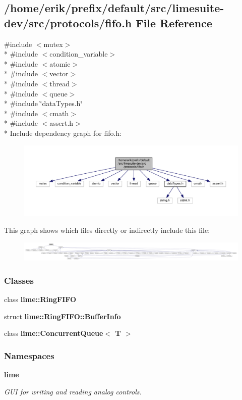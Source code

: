 \subsection{/home/erik/prefix/default/src/limesuite-\/dev/src/protocols/fifo.h File Reference}
\label{fifo_8h}
{\ttfamily \#include $<$mutex$>$}\\*
{\ttfamily \#include $<$condition\+\_\+variable$>$}\\*
{\ttfamily \#include $<$atomic$>$}\\*
{\ttfamily \#include $<$vector$>$}\\*
{\ttfamily \#include $<$thread$>$}\\*
{\ttfamily \#include $<$queue$>$}\\*
{\ttfamily \#include \char`\"{}data\+Types.\+h\char`\"{}}\\*
{\ttfamily \#include $<$cmath$>$}\\*
{\ttfamily \#include $<$assert.\+h$>$}\\*
Include dependency graph for fifo.\+h\+:
\nopagebreak
\begin{figure}[H]
\begin{center}
\leavevmode
\includegraphics[width=350pt]{d8/d86/fifo_8h__incl}
\end{center}
\end{figure}
This graph shows which files directly or indirectly include this file\+:
\nopagebreak
\begin{figure}[H]
\begin{center}
\leavevmode
\includegraphics[width=350pt]{df/db1/fifo_8h__dep__incl}
\end{center}
\end{figure}
\subsubsection*{Classes}
\begin{DoxyCompactItemize}
\item 
class {\bf lime\+::\+Ring\+F\+I\+FO}
\item 
struct {\bf lime\+::\+Ring\+F\+I\+F\+O\+::\+Buffer\+Info}
\item 
class {\bf lime\+::\+Concurrent\+Queue$<$ T $>$}
\end{DoxyCompactItemize}
\subsubsection*{Namespaces}
\begin{DoxyCompactItemize}
\item 
 {\bf lime}
\begin{DoxyCompactList}\small\item\em G\+UI for writing and reading analog controls. \end{DoxyCompactList}\end{DoxyCompactItemize}
